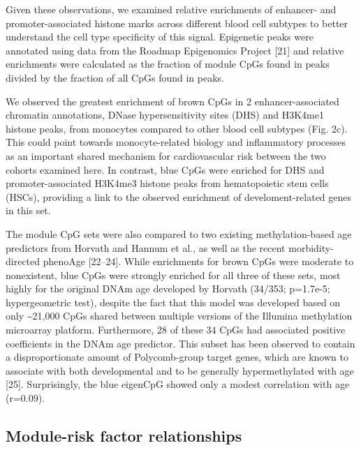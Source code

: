 \documentclass[]{article}
\theoremstyle{definition}
\theoremstyle{definition}
\theoremstyle{definition}
\theoremstyle{remark}
\begin{document}
Given these observations, we examined relative enrichments of enhancer-
and promoter-associated histone marks across different blood cell
subtypes to better understand the cell type specificity of this signal.
Epigenetic peaks were annotated using data from the Roadmap Epigenomics
Project {[}21{]} and relative enrichments were calculated as the
fraction of module CpGs found in peaks divided by the fraction of all
CpGs found in peaks.

We observed the greatest enrichment of brown CpGs in 2
enhancer-associated chromatin annotations, DNase hypersensitivity sites
(DHS) and H3K4me1 histone peaks, from monocytes compared to other blood
cell subtypes (Fig. 2c). This could point towards monocyte-related
biology and inflammatory processes as an important shared mechanism for
cardiovascular risk between the two cohorts examined here. In contrast,
blue CpGs were enriched for DHS and promoter-associated H3K4me3 histone
peaks from hematopoietic stem cells (HSCs), providing a link to the
observed enrichment of develoment-related genes in this set.

The module CpG sets were also compared to two existing methylation-based
age predictors from Horvath and Hannum et al., as well as the recent
morbidity-directed phenoAge {[}22--24{]}. While enrichments for brown
CpGs were moderate to nonexistent, blue CpGs were strongly enriched for
all three of these sets, most highly for the original DNAm age developed
by Horvath (34/353; p=1.7e-5; hypergeometric test), despite the fact
that this model was developed based on only \textasciitilde{}21,000 CpGs
shared between multiple versions of the Illumina methylation microarray
platform. Furthermore, 28 of these 34 CpGs had associated positive
coefficients in the DNAm age predictor. This subset has been observed to
contain a disproportionate amount of Polycomb-group target genes, which
are known to associate with both developmental and to be generally
hypermethylated with age {[}25{]}. Surprisingly, the blue eigenCpG
showed only a modest correlation with age (r=0.09).

\subsection{Module-risk factor
relationships}\label{module-risk-factor-relationships}
\end{document}
